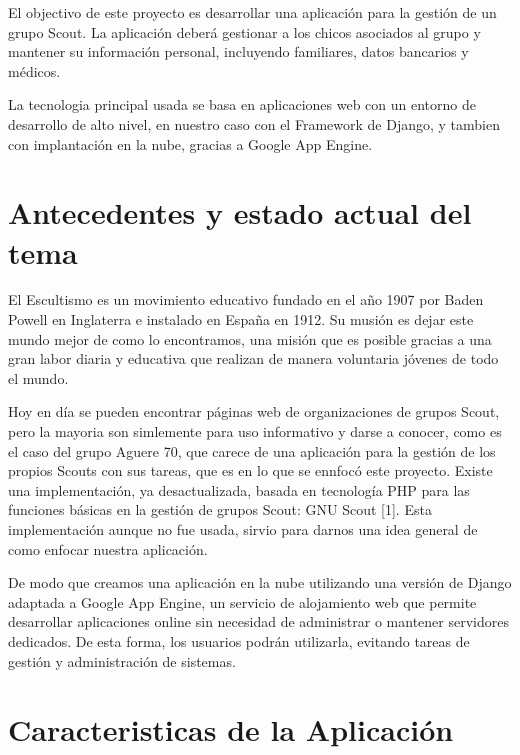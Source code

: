 El objectivo de este proyecto es desarrollar una aplicación para la gestión de un grupo
 Scout. La aplicación deberá gestionar a los chicos asociados al grupo y mantener su 
información personal, incluyendo familiares, datos bancarios y médicos. 

La tecnologia principal usada se basa en aplicaciones web con un entorno de desarrollo de alto
nivel, en nuestro caso con el Framework de Django, y tambien con implantación en la nube, gracias a 
Google App Engine.
\section{Antecedentes y estado actual del tema}
\label{1:sec:1}
El Escultismo es un movimiento educativo fundado en el año 1907 por Baden Powell en Inglaterra
e instalado en España en 1912. Su musión es dejar este mundo mejor de como lo encontramos,
una misión que es posible gracias a una gran labor diaria y educativa que realizan de manera
voluntaria jóvenes de todo el mundo.

Hoy en día se pueden encontrar páginas web de organizaciones de grupos Scout,  pero la mayoria
son simlemente para uso informativo y darse a conocer, como es el caso del grupo Aguere 70, que carece de
una aplicación para la gestión de los propios Scouts con sus tareas, que es en lo que se ennfocó este proyecto. Existe
una implementación, ya desactualizada, basada en tecnología PHP para las funciones básicas en la gestión de grupos
Scout: GNU Scout [1]. Esta implementación aunque no fue usada, sirvio para darnos una idea general
de como enfocar nuestra aplicación.

De modo que creamos una aplicación en la nube utilizando una versión de Django adaptada a Google 
App Engine, un servicio de alojamiento web que permite desarrollar aplicaciones online sin 
necesidad de administrar o mantener servidores dedicados. De esta forma, los usuarios podrán utilizarla, evitando 
tareas de gestión y administración de sistemas.


\section{Caracteristicas de la Aplicación}
\label{1:sec:2}

